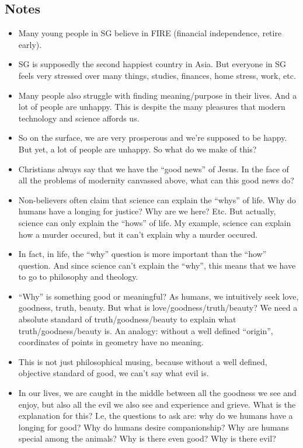 \subsection*{Notes}
\begin{itemize}
  \item Many young people in SG believe in FIRE (financial independence, retire early). 
  \item SG is supposedly the second happiest country in Asia. But everyone in SG feels very stressed over many things, studies, finances, home stress, work, etc.
  \item Many people also struggle with finding meaning/purpose in their lives. And a lot of people are unhappy. This is despite the many pleasures that modern technology and science affords us.
  \item So on the surface, we are very prosperous and we’re supposed to be happy. But yet, a lot of people are unhappy. So what do we make of this?
  \item Christians always say that we have the “good news” of Jesus. In the face of all the problems of modernity canvassed above, what can this good news do?
  \item Non-believers often claim that science can explain the “whys” of life. Why do humans have a longing for justice? Why are we here? Etc. But actually, science can only explain the “hows” of life. My example, science can explain how a murder occured, but it can’t explain why a murder occured.
  \item In fact, in life, the “why” question is more important than the “how” question. And since science can’t explain the “why”, this means that we have to go to philosophy and theology. 
  \item “Why” is something good or meaningful? As humans, we intuitively seek love, goodness, truth, beauty. But what is love/goodness/truth/beauty? We need a absolute standard of truth/goodness/beauty to explain what truth/goodness/beauty is. An analogy: without a well defined “origin”, coordinates of points in geometry have no meaning.
  \item This is not just philosophical musing, because without a well defined, objective standard of good, we can’t say what evil is. 
  \item In our lives, we are caught in the middle between all the goodness we see and enjoy, but also all the evil we also see and experience and grieve. What is the explanation for this? I.e, the questions to ask are: why do we humans have a longing for good? Why do humans desire companionship? Why are humans special among the animals? Why is there even good? Why is there evil?

\end{itemize}
